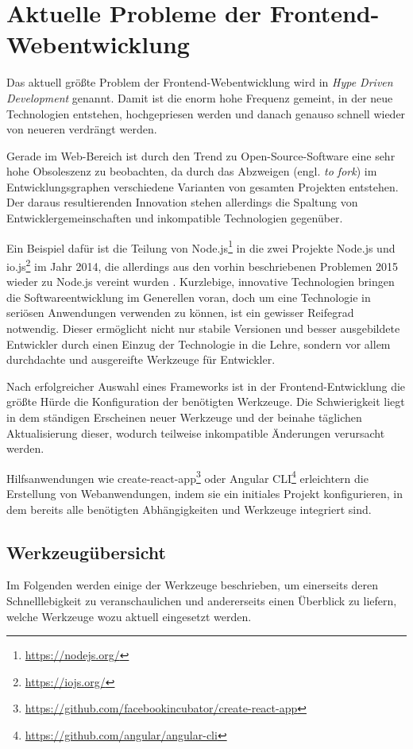 \chapter{Aktuelle Probleme der Frontend-Webentwicklung}
\label{cha:frontend-problems}

Das aktuell größte Problem der Frontend-Webentwicklung wird in \autocite{Kirejczyk.HDD:online} \emph{Hype Driven Development} genannt.
Damit ist die enorm hohe Frequenz gemeint, in der neue Technologien entstehen, hochgepriesen werden und danach genauso schnell wieder von neueren verdrängt werden.

Gerade im Web-Bereich ist durch den Trend zu Open-Source-Software eine sehr hohe Obsoleszenz zu beobachten, da durch das Abzweigen (engl. \emph{to fork}) im Entwicklungsgraphen verschiedene Varianten von gesamten Projekten entstehen.
Der daraus resultierenden Innovation stehen allerdings die Spaltung von Entwicklergemeinschaften und inkompatible Technologien gegenüber.

Ein Beispiel dafür ist die Teilung von Node.js\footnote{\url{https://nodejs.org/}} in die zwei Projekte Node.js und io.js\footnote{\url{https://iojs.org/}} im Jahr 2014, die allerdings aus den vorhin beschriebenen Problemen 2015 wieder zu Node.js vereint wurden \autocite{Node.io-node-merge:online}.
Kurzlebige, innovative Technologien bringen die Soft\-ware\-ent\-wick\-lung im Generellen voran, doch um eine Technologie in seriösen Anwendungen verwenden zu können, ist ein gewisser Reifegrad notwendig.
Dieser ermöglicht nicht nur stabile Versionen und besser ausgebildete Entwickler durch einen Einzug der Technologie in die Lehre, sondern vor allem durchdachte und ausgereifte Werkzeuge für Entwickler.

Nach erfolgreicher Auswahl eines Frameworks ist in der Frontend-Entwicklung die größte Hürde die Konfiguration der benötigten Werkzeuge.
Die Schwierigkeit liegt in dem ständigen Erscheinen neuer Werkzeuge und der beinahe täglichen Aktualisierung dieser, wodurch teilweise inkompatible Änderungen verursacht werden.

Hilfsanwendungen wie create-react-app\footnote{\url{https://github.com/facebookincubator/create-react-app}} oder Angular CLI\footnote{\url{https://github.com/angular/angular-cli}} erleichtern die Erstellung von Webanwendungen, indem sie ein initiales Projekt konfigurieren, in dem bereits alle benötigten Abhängigkeiten und Werkzeuge integriert sind.


\section{Werkzeugübersicht}
\label{sec:tools-overview}
Im Folgenden werden einige der Werkzeuge beschrieben, um einerseits deren Schnelllebigkeit zu veranschaulichen und andererseits einen Überblick zu liefern, welche Werkzeuge wozu aktuell eingesetzt werden.

